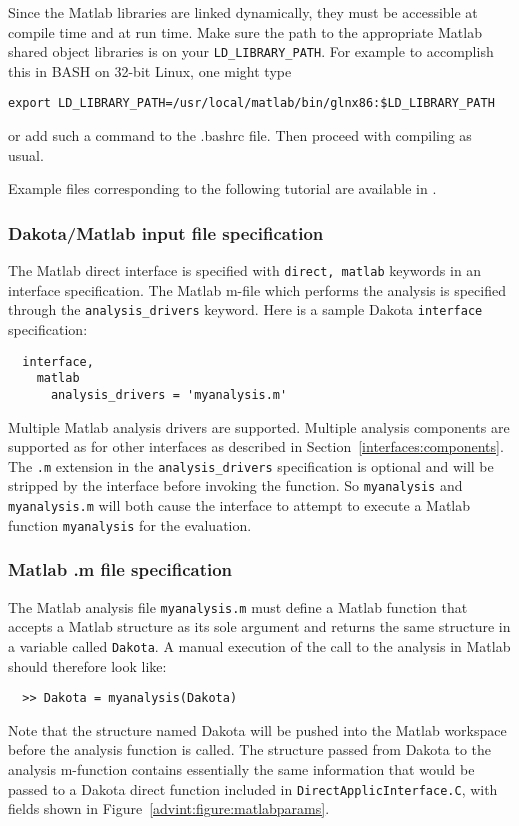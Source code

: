 Since the Matlab libraries are linked dynamically, they must be
accessible at compile time and at run time. Make sure the path to the
appropriate Matlab shared object libraries is on your 
{\tt LD\_LIBRARY\_PATH}. For example to accomplish this in BASH on
32-bit Linux, one might type
\begin{verbatim}
export LD_LIBRARY_PATH=/usr/local/matlab/bin/glnx86:$LD_LIBRARY_PATH
\end{verbatim}
or add such a command to the .bashrc file. Then proceed with
compiling as usual.

Example files corresponding to the following tutorial are available in
.

\subsubsection{Dakota/Matlab input file specification}

The Matlab direct interface is specified with {\tt direct, matlab}
keywords in an interface specification. The Matlab m-file which
performs the analysis is specified through the {\tt analysis\_drivers}
keyword. Here is a sample Dakota {\tt interface} specification:
\begin{small}
\begin{verbatim}
  interface,
    matlab
      analysis_drivers = 'myanalysis.m'
\end{verbatim} 
\end{small}

Multiple Matlab analysis drivers are supported. Multiple analysis
components are supported as for other interfaces as described in
Section~\ref{interfaces:components}. The {\tt .m} extension in the
{\tt analysis\_drivers} specification is optional and will be stripped
by the interface before invoking the function. So {\tt myanalysis}
and {\tt myanalysis.m} will both cause the interface to attempt to
execute a Matlab function {\tt myanalysis} for the evaluation.

\subsubsection{Matlab .m file specification}

The Matlab analysis file {\tt myanalysis.m} must define a Matlab
function that accepts a Matlab structure as its sole argument and
returns the same structure in a variable called {\tt Dakota}. A
manual execution of the call to the analysis in Matlab should
therefore look like:
\begin{small}
\begin{verbatim}
  >> Dakota = myanalysis(Dakota)
\end{verbatim} 
\end{small}
Note that the structure named Dakota will be pushed into the Matlab
workspace before the analysis function is called. The structure
passed from Dakota to the analysis m-function contains essentially the
same information that would be passed to a Dakota direct function
included in {\tt DirectApplicInterface.C}, with fields shown in
Figure~\ref{advint:figure:matlabparams}.

